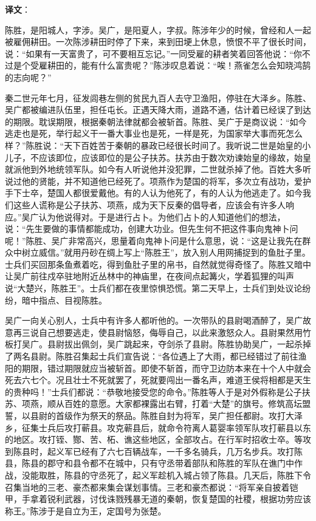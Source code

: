 \documentclass[12pt,UTF-8,openany,a4]{ctexbook}
\begin{document}
\newpage

\begin{Large}
   \noindent \textbf{译文}：
\end{Large}

\vspace{1em}

\begin{large}\yiwen
    
    陈胜，是阳城人，字涉。吴广，是阳夏人，字叔。陈涉年少的时候，曾经和人一起被雇佣耕田。一次陈涉耕田时停了下来，来到田埂上休息，愤恨不平了很长时间，说：“如果有一天富贵了，可不要相互忘记。”一同受雇的耕者笑着回答他说：“你不过是个受雇耕田的，能有什么富贵呢？”陈涉叹息着说：“唉！燕雀怎么会知晓鸿鹄的志向呢？”
    
    秦二世元年七月，征发闾巷左侧的贫民九百人去守卫渔阳，停驻在大泽乡。陈胜、吴广都被编进队伍里，担任屯长。正遇天降大雨，道路不通，估计着已经误了到达的期限。耽误期限，根据秦朝法律就都会被斩首。陈胜、吴广于是商议说：“如今逃走也是死，举行起义干一番大事业也是死，一样是死，为国家举大事而死怎么样？”陈胜说：“天下百姓苦于秦朝的暴政已经很长时间了。我听说二世是始皇的小儿子，不应该即位，应该即位的是公子扶苏。扶苏由于数次劝谏始皇的缘故，始皇就派他到外地统领军队。如今有人听说他并没犯罪，二世就杀掉了他。百姓大多听说过他的贤能，并不知道他已经死了。项燕作为楚国的将军，多次立有战功，爱护手下士卒，楚国人都很爱戴他。有的人认为他死了，有的人认为他逃走了。如今我们这些人谎称是公子扶苏、项燕，成为天下反秦的倡导者，应该会有许多人响应。”吴广认为他说得对。于是进行占卜。为他们占卜的人知道他们的想法，说：“先生要做的事情都能成功，创建大功业。但先生何不把这件事向鬼神卜问呢！”陈胜、吴广非常高兴，思量着向鬼神卜问是什么意思，说：“这是让我先在群众中树立威信。”就用丹砂在绸上写上“陈胜王”，放入别人用网捕捉到的鱼肚子里。士兵们买回那条鱼煮着吃，得到鱼肚子里的帛书，自然就觉得奇怪了。陈胜又暗中让吴广前往戍卒驻地附近丛林中的神庙里，在夜间点起篝火，学着狐狸的叫声说“大楚兴，陈胜王”。士兵们都在夜里惊惧恐慌。第二天早上，士兵们到处议论纷纷，暗中指点、目视陈胜。
    
    吴广一向关心别人，士兵中有许多人都听他的。一次带队的县尉喝酒醉了，吴广故意再三说自己想要逃走，使县尉恼怒，侮辱自己，以此来激怒众人。县尉果然用竹板打吴广。县尉拔出佩剑，吴广跳起来，夺剑杀了县尉。陈胜协助吴广，一起杀掉了两名县尉。陈胜召集起士兵们宣告说：“各位遇上了大雨，都已经错过了前往渔阳的期限，错过期限就应当被斩首。即使不斩首，而守卫边防本来在十个人中就会死去六七个。况且壮士不死就罢了，死就要闯出一番名声，难道王侯将相都是天生的贵种吗！”士兵们都说：“恭敬地接受您的命令。”陈胜等人于是对外假称是公子扶苏、项燕，顺从百姓的意愿。大家都裸露出右臂，打着“大楚”的旗号。修筑高坛盟誓，以县尉的首级作为祭天的祭品。陈胜自封为将军，吴广担任都尉。攻打大泽乡，征集士兵后攻打蕲县。攻克蕲县后，就命令符离人葛婴率领军队攻打蕲县以东的地区。攻打铚、酂、苦、柘、谯这些地区，全部攻占。在行军时招收士卒。等攻到陈县时，起义军已经有了六七百辆战车，一千多名骑兵，几万名步兵。攻打陈县，陈县的郡守和县令都不在城中，只有守丞带着部队和陈胜的军队在谯门中作战，没能取胜，陈县的守丞死了，起义军趁机入城占领了陈县。几天后，陈胜下令召集当地的三老、豪杰都来集会谋划事情。三老和豪杰都说：“将军亲自披着铠甲，手拿着锐利武器，讨伐诛戮残暴无道的秦朝，恢复楚国的社稷，根据功劳应该称王。”陈涉于是自立为王，定国号为张楚。
    

\end{large}
\end{document}
